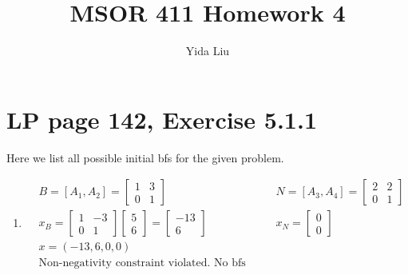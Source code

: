 \documentclass[11pt]{article}
\begin{document}
\author{Yida Liu}
\title{MSOR 411 Homework 4}
\maketitle

\section{LP page 142, Exercise 5.1.1}\label{prob:1}

Here we list all possible initial bfs for the given problem.

\begin{enumerate}
    \item \begin{align*}
        & B = [A_1, A_2]=\begin{bmatrix} 1 & 3 \\ 0 & 1\end{bmatrix} & N = [A_3, A_4]=\begin{bmatrix} 2 & 2 \\ 0 & 1\end{bmatrix} \\
        & x_B = \begin{bmatrix} 1 & -3 \\ 0 & 1\end{bmatrix} \begin{bmatrix} 5 \\ 6 \end{bmatrix} = \begin{bmatrix} -13 \\ 6 \end{bmatrix} & x_N = \begin{bmatrix} 0 \\ 0\end{bmatrix} \\
        & x = (-13, 6, 0, 0) &\\
        & \text{Non-negativity constraint violated. No bfs generated.} &
    \end{align*}
    

\end{enumerate}
\end{document}
